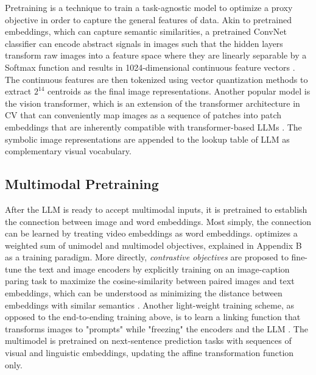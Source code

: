 \documentclass[11pt]{article}
\begin{document}
Pretraining is a technique to train a task-agnostic model to optimize a proxy objective in order to capture the general features of data. Akin to pretrained embeddings, which can capture semantic similarities, a pretrained ConvNet classifier can encode abstract signals in images such that the hidden layers transform raw images into a feature space where they are linearly separable by a Softmax function and results in 1024-dimensional continuous feature vectors \citep{DBLP:conf/iccv/SunMV0S19}. The continuous features are then tokenized using vector quantization methods to extract $2^{14}$ centroids as the final image representations. Another popular model is the vision transformer, which is an extension of the transformer architecture in CV that can conveniently map images as a sequence of patches into patch embeddings that are inherently compatible with transformer-based LLMs \citep{DBLP:conf/iclr/DosovitskiyB0WZ21, DBLP:conf/icml/DriessXSLCIWTVY23, DBLP:conf/icml/RadfordKHRGASAM21}. The symbolic image representations are appended to the lookup table of LLM as complementary visual vocabulary. 

\subsection{Multimodal Pretraining}
After the LLM is ready to accept multimodal inputs, it is pretrained to establish the connection between image and word embeddings. Most simply, the connection can be learned by treating video embeddings as word embeddings. \citet{DBLP:conf/iccv/SunMV0S19} optimizes a weighted sum of unimodel and multimodel objectives, explained in Appendix B as a training paradigm. More directly, \textit{contrastive objectives} are proposed to fine-tune the text and image encoders by explicitly training on an image-caption paring task to maximize the cosine-similarity between paired images and text embeddings, which can be understood as minimizing the distance between embeddings with similar semantics \citep{DBLP:conf/icml/RadfordKHRGASAM21}. Another light-weight training scheme, as opposed to the end-to-ending training above, is to learn a linking function that transforms images to "prompts" while "freezing" the encoders and the LLM \citep{DBLP:conf/icml/DriessXSLCIWTVY23}. The multimodel is pretrained on next-sentence prediction tasks with sequences of visual and linguistic embeddings, updating the affine transformation function only.
\end{document}
